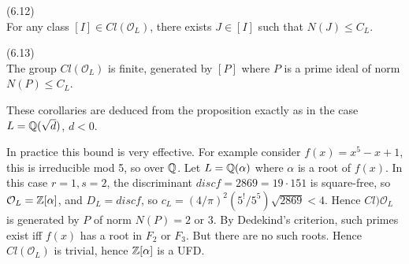 \documentclass[a4paper]{article}
\begin{document}
\begin{coro} (6.12)\\
For any class $[I] \in Cl(\mathcal{O}_L)$, there exists $J \in [I]$ such that $N(J) \leq C_L$.
\end{coro}

\begin{coro} (6.13)\\
The group $Cl(\mathcal{O}_L)$ is finite, generated by $[P]$ where $P$ is a prime ideal of norm $N(P) \leq C_L$.
\end{coro}

These corollaries are deduced from the proposition exactly as in the case $L=\mathbb{Q}(\sqrt{d})$, $d<0$.

\begin{rem}
In practice this bound is very effective. For example consider $f(x) = x^5 -x+1$, this is irreducible mod 5, so over $\mathbb{Q}$. Let $L=\mathbb{Q}(\alpha)$ where $\alpha$ is a root of $f(x)$. In this case $r=1,s=2$, the discriminant $disc f = 2869 = 19 \cdot 151$ is square-free, so $\mathcal{O}_L = \mathbb{Z}[\alpha]$, and $D_L = disc f$, so $c_L =(4/\pi)^2 (5^!/5^5) \sqrt{2869} < 4$. Hence $Cl)\mathcal{O}_L$ is generated by $P$ of norm $N(P) = 2$ or $3$. By Dedekind's criterion, such primes exist iff $f(x)$ has a root in $F_2$ or $F_3$. But there are no such roots. Hence $Cl(\mathcal{O}_L)$ is trivial, hence $\mathbb{Z}[\alpha]$ is a UFD.
\end{rem}

\iffalse
\begin{equation*}
\begin{aligned}

\end{aligned}
\end{equation*}
\fi
\end{document}

